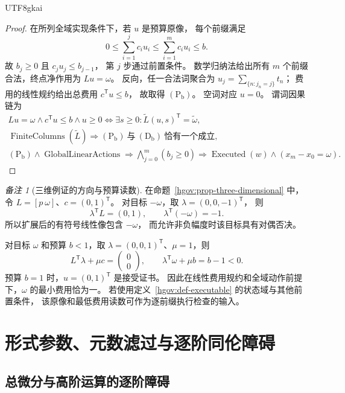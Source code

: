 \documentclass[12pt,a4paper,openany,notitlepage]{report}
\theoremstyle{plain}
\theoremstyle{definition}
\theoremstyle{remark}
\newtheorem{remark}[theorem]{备注}
\begin{document}
\begin{CJK*}{UTF8}{gkai}
\begin{proof}
在所列全域实现条件下，若 $u$ 是预算原像，
每个前缀满足
\[
 0\le\sum_{i=1}^{j}c_i u_i
 \le\sum_{i=1}^{m}c_i u_i\le b.
\]
故 $b_j\ge0$ 且 $c_ju_j\le b_{j-1}$，
第 $j$ 步通过前置条件。
数学归纳法给出所有 $m$ 个前缀合法，终点净作用为 $Lu=\omega$。
反向，任一合法词聚合为 $u_j=\sum_{\{n:j_n=j\}}t_n$；
费用的线性规约给出总费用 $c^{\mathsf T}u\le b$，
故取得 $\mathrm{(P_b)}$。
空词对应 $u=0$。
谓词因果链为
\[
 \begin{gathered}
 Lu=\omega\land c^{\mathsf T}u\le b\land u\ge0
 \Longleftrightarrow
 \exists s\ge0:\widetilde L(u,s)^{\mathsf T}
                   =\widetilde\omega,\\
 \operatorname{FiniteColumns}(\widetilde L)
 \Rightarrow\mathrm{(P_b)}\ \text{与}\ \mathrm{(D_b)}
          \ \text{恰有一个成立},\\
 \mathrm{(P_b)}\land\operatorname{GlobalLinearActions}
 \Rightarrow\bigwedge_{j=0}^{m}(b_j\ge0)
 \Rightarrow\operatorname{Executed}(w)\land(x_m-x_0=\omega).
 \end{gathered}
\]
\end{proof}

\begin{remark}[三维例证的方向与预算读数]
\label{exp:hom:budget-example}
在命题~\ref{hgov:prop-three-dimensional} 中，
令 $L=[p\ \omega]$、$c=(0,1)^{\mathsf T}$。
对目标 $-\omega$，取 $\lambda=(0,0,-1)^{\mathsf T}$，
则
\[
 \lambda^{\mathsf T}L=(0,1),\qquad
 \lambda^{\mathsf T}(-\omega)=-1.
\]
所以扩展后的有符号线性像包含 $-\omega$，
而允许非负幅度时该目标具有对偶否决。

对目标 $\omega$ 和预算 $b<1$，取
$\lambda=(0,0,1)^{\mathsf T}$、$\mu=1$，则
\[
 L^{\mathsf T}\lambda+\mu c=\begin{pmatrix}0\\0\end{pmatrix},
 \qquad
 \lambda^{\mathsf T}\omega+\mu b=b-1<0.
\]
预算 $b=1$ 时，$u=(0,1)^{\mathsf T}$ 是接受证书。
因此在线性费用规约和全域动作前提下，$\omega$ 的最小费用恰为一。
若使用定义~\ref{hgov:def-executable} 的状态域与其他前置条件，
该原像和最低费用读数可作为逐前缀执行检查的输入。
\end{remark}


\chapter{形式参数、元数滤过与逐阶同伦障碍}
\label{exp:ch:tower}

\section{总微分与高阶运算的逐阶障碍}
\label{hgov:higher-obstruction}


\end{CJK*}
\end{document}
